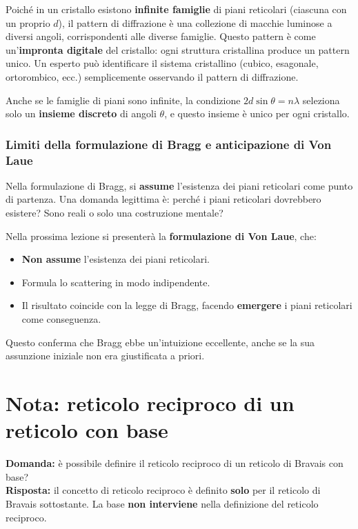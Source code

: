 Poiché in un cristallo esistono \textbf{infinite famiglie} di piani reticolari (ciascuna con un proprio $d$), il pattern di diffrazione è una collezione di macchie luminose a diversi angoli, corrispondenti alle diverse famiglie. Questo pattern è come un'\textbf{impronta digitale} del cristallo: ogni struttura cristallina produce un pattern unico. Un esperto può identificare il sistema cristallino (cubico, esagonale, ortorombico, ecc.) semplicemente osservando il pattern di diffrazione.

\begin{nota}
Anche se le famiglie di piani sono infinite, la condizione $2d\sin\theta = n\lambda$ seleziona solo un \textbf{insieme discreto} di angoli $\theta$, e questo insieme è unico per ogni cristallo.
\end{nota}

\subsubsection{Limiti della formulazione di Bragg e anticipazione di Von Laue}

Nella formulazione di Bragg, si \textbf{assume} l'esistenza dei piani reticolari come punto di partenza. Una domanda legittima è: perché i piani reticolari dovrebbero esistere? Sono reali o solo una costruzione mentale?

Nella prossima lezione si presenterà la \textbf{formulazione di Von Laue}, che:
\begin{itemize}
    \item \textbf{Non assume} l'esistenza dei piani reticolari.
    \item Formula lo scattering in modo indipendente.
    \item Il risultato coincide con la legge di Bragg, facendo \textbf{emergere} i piani reticolari come conseguenza.
\end{itemize}

Questo conferma che Bragg ebbe un'intuizione eccellente, anche se la sua assunzione iniziale non era giustificata a priori.

\section{Nota: reticolo reciproco di un reticolo con base}

\textbf{Domanda:} è possibile definire il reticolo reciproco di un reticolo di Bravais con base?\\
\textbf{Risposta:} il concetto di reticolo reciproco è definito \textbf{solo} per il reticolo di Bravais sottostante. La base \textbf{non interviene} nella definizione del reticolo reciproco.

